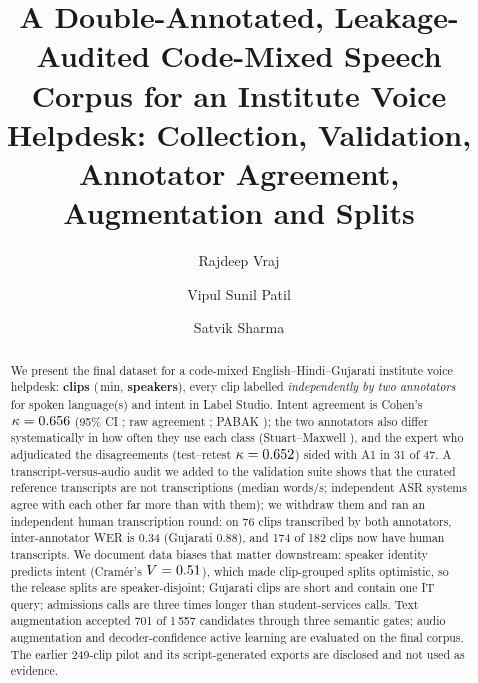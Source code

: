 \documentclass[sigconf,authordraft]{acmart}
\begin{document}
\title[Project 5 -- Assignment 1: Voice Helpdesk Data]{%
  A Double-Annotated, Leakage-Audited Code-Mixed Speech Corpus for an Institute Voice Helpdesk:
  Collection, Validation, Annotator Agreement, Augmentation and Splits}

\author{Rajdeep Vraj}
\author{Vipul Sunil Patil}
\authornotemark[1]
\author{Satvik Sharma}
\authornotemark[1]
\renewcommand{\shortauthors}{Vraj, Patil and Sharma}

\begin{abstract}
We present the final dataset for a code-mixed English--Hindi--Gujarati institute voice helpdesk: \textbf{\FClips{} clips} (\FMin{}\,min, \textbf{\FSpk{} speakers}), every clip labelled \emph{independently by two annotators} for spoken language(s) and intent in Label Studio.
Intent agreement is Cohen's $\kappa=0.656$ (95\% CI \FKapCI{}; raw agreement \FAgr{}; PABAK \FPabak{}); the two annotators also differ systematically in how often they use each class (Stuart--Maxwell \AnnSM{}), and the expert who adjudicated the \FAdj{} disagreements (test--retest $\kappa=0.652{}$) sided with A1 in 31 of 47.
A transcript-versus-audio audit we added to the validation suite shows that the curated reference transcripts are not transcriptions (median \RefWps{} words/s; independent ASR systems agree with each other far more than with them); we withdraw them and ran an independent human transcription round: on 76 clips transcribed by both annotators, inter-annotator WER is 0.34 (Gujarati 0.88), and 174 of 182 clips now have human transcripts.
We document data biases that matter downstream: speaker identity predicts intent (Cram\'er's $V=0.51{}$), which made clip-grouped splits optimistic, so the release splits are speaker-disjoint; Gujarati clips are short and contain one IT query; admissions calls are three times longer than student-services calls.
Text augmentation accepted 701 of 1\,557 candidates through three semantic gates; audio augmentation and decoder-confidence active learning are evaluated on the final corpus. The earlier 249-clip pilot and its script-generated exports are disclosed and not used as evidence.
\end{abstract}
\end{document}
